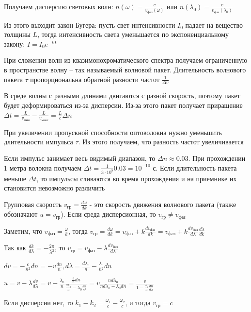 \documentclass[12pt]{article}
\begin{document}
Получаем дисперсию световых волн: $n(\omega) = \frac{c}{v_{фаз}(\omega)}$ или $n(\lambda_0) = \frac{c}{v_{фаз}(\lambda_0)}$

Из этого выходит закон Бугера: пусть свет интенсивности $I_0$ падает на вещество толщины $L$, тогда интенсивность света уменьшается по экспоненциальному закону: $I = I_0 e^{- k L}$

При сложении волн из квазимонохроматического спектра получаем ограниченную в пространстве волну -- так называемый волновой пакет. Длительность волнового пакета $\tau$ пропорциональна обратной разности частот $\frac{1}{\Delta v}$

В среде волны с разными длинами двигаются с разной скорость, поэтому пакет будет деформироваться из-за дисперсии. Из-за этого пакет получает приращение $\Delta t = \frac{L}{v_{мин}} - \frac{L}{v_{макс}} = \frac{L}{c} \Delta n$

При увеличении пропускной способности оптоволокна нужно уменьшить длительности импульса $\tau$. Из этого получаем, что разность частот увеличивается

Если импульс занимает весь видимый диапазон, то $\Delta n \approx 0.03$. При прохождении 1 метра волокна получаем $\Delta t = \frac{1}{3 \cdot 10^8} 0.03 = 10^{-10}$ с. Если длительность пакета меньше $\Delta t$, то импульсы сливаются во время прохождения и на приемнике их становится невозможно различить 

Групповая скорость $v_{\text{гр}} = \frac{d\omega}{dk}$ - это скорость движения волнового пакета (также обозначают $u = v_\text{гр}$). Если среда дисперсионная, то $v_{\text{гр}} \neq v_{\text{фаз}}$

Заметим, что $v_{\text{фаз}} = \frac{\omega}{k}$, тогда $v_{\text{гр}} = \frac{d\omega}{dk} = v_{\text{фаз}} + k \frac{d v_{\text{фаз}}}{dk} = v_{\text{фаз}} + k \frac{d v_{\text{фаз}}}{d\lambda} \frac{d\lambda}{dk}$

Так как $\frac{dk}{d\lambda} = -\frac{2\pi}{\lambda^2}$, то $v_{\text{гр}} = v_{\text{фаз}} - \lambda \frac{d v_{\text{фаз}}}{d\lambda}$

$dv = - \frac{c}{n^2} dn = -v \frac{dn}{n}, d\lambda = \frac{d \lambda_0}{n} - \frac{\lambda_0}{n^2} dn$

$u = v - \lambda \frac{dv}{d\lambda} = v + \frac{\lambda_0}{n} \frac{\frac{v}{n} dn}{\frac{d \lambda_0}{n} - \lambda_0 \frac{dn}{n^2}} = v \frac{n d\lambda_0}{n d\lambda_0 - \lambda_0 dn} = \frac{v}{1 - \frac{\lambda_0}{n} \frac{dn}{d\lambda}}$

Если дисперсии нет, то $k_1 - k_2 = \frac{\omega_1}{c} - \frac{\omega_2}{c}$, и тогда $v_{\text{гр}} = c$
\end{document}
